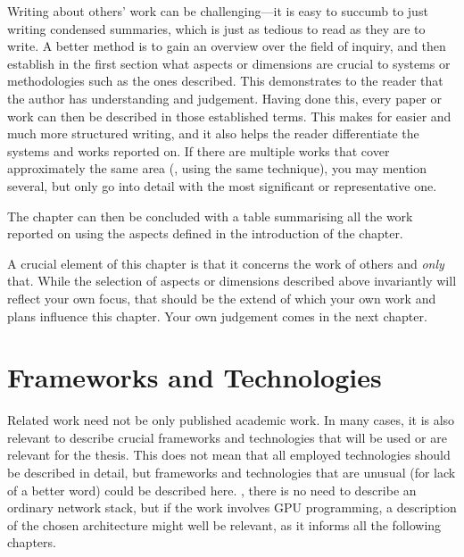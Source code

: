 Writing about others' work can be challenging---it is easy to succumb
to just writing condensed summaries, which is just as tedious to read
as they are to write. A better method is to gain an overview over the
field of inquiry, and then establish in the first section what aspects
or dimensions are crucial to systems or methodologies such as the ones
described. This demonstrates to the reader that the author has
understanding and judgement. Having done this, every paper or work can
then be described in those established terms. This makes for easier
and much more structured writing, and it also helps the reader
differentiate the systems and works reported on. If there are multiple
works that cover approximately the same area (\eg, using the same
technique), you may mention several, but only go into detail with the
most significant or representative one.

The chapter can then be concluded with a table summarising all the
work reported on using the aspects defined in the introduction of the
chapter.

A crucial element of this chapter is that it concerns the work of
others and \emph{only} that. While the selection of aspects or
dimensions described above invariantly will reflect your own focus,
that should be the extend of which your own work and plans influence
this chapter.  Your own judgement comes in the next chapter.

\section{Frameworks and Technologies}
\label{sec:fram-techn}

Related work need not be only published academic work. In many cases,
it is also relevant to describe crucial frameworks and technologies
that will be used or are relevant for the thesis.  This does not mean
that all employed technologies should be described in detail, but
frameworks and technologies that are unusual (for lack of a better
word) could be described here. \Eg, there is no need to describe an
ordinary network stack, but if the work involves GPU programming, a
description of the chosen architecture might well be relevant, as it
informs all the following chapters.
